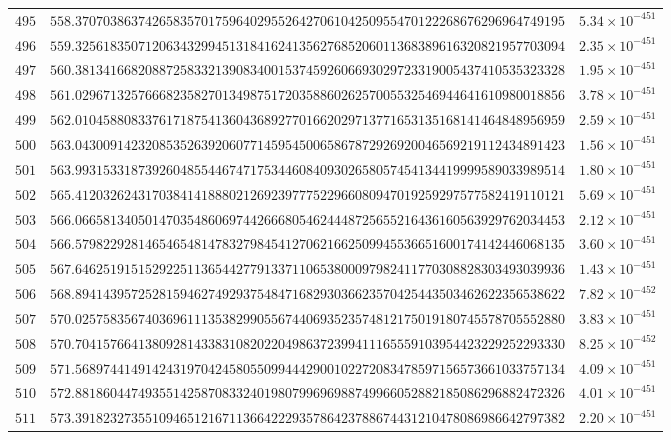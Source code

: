 \documentclass[12pt,reqno]{amsart}
\theoremstyle{remark}
\begin{document}
\begin{longtable}{clc}
$495$ & $558.3707038637426583570175964029552642706104250955470122268676296964749195$ & $5.34\times 10^{-451}$ \\
$496$ & $559.3256183507120634329945131841624135627685206011368389616320821957703094$ & $2.35\times 10^{-451}$ \\
$497$ & $560.3813416682088725833213908340015374592606693029723319005437410535323328$ & $1.95\times 10^{-451}$ \\
$498$ & $561.0296713257666823582701349875172035886026257005532546944641610980018856$ & $3.78\times 10^{-451}$ \\
$499$ & $562.0104588083376171875413604368927701662029713771653135168141464848956959$ & $2.59\times 10^{-451}$ \\
$500$ & $563.0430091423208535263920607714595450065867872926920046569219112434891423$ & $1.56\times 10^{-451}$ \\
$501$ & $563.9931533187392604855446747175344608409302658057454134419999589033989514$ & $1.80\times 10^{-451}$ \\
$502$ & $565.4120326243170384141888021269239777522966080947019259297577582419110121$ & $5.69\times 10^{-451}$ \\
$503$ & $566.0665813405014703548606974426668054624448725655216436160563929762034453$ & $2.12\times 10^{-451}$ \\
$504$ & $566.5798229281465465481478327984541270621662509945536651600174142446068135$ & $3.60\times 10^{-451}$ \\
$505$ & $567.6462519151529225113654427791337110653800097982411770308828303493039936$ & $1.43\times 10^{-451}$ \\
$506$ & $568.8941439572528159462749293754847168293036623570425443503462622356538622$ & $7.82\times 10^{-452}$ \\
$507$ & $570.0257583567403696111353829905567440693523574812175019180745578705552880$ & $3.83\times 10^{-451}$ \\
$508$ & $570.7041576641380928143383108202204986372399411165559103954423229252293330$ & $8.25\times 10^{-452}$ \\
$509$ & $571.5689744149142431970424580550994442900102272083478597156573661033757134$ & $4.09\times 10^{-451}$ \\
$510$ & $572.8818604474935514258708332401980799696988749966052882185086296882472326$ & $4.01\times 10^{-451}$ \\
$511$ & $573.3918232735510946512167113664222935786423788674431210478086986642797382$ & $2.20\times 10^{-451}$ \\

\end{longtable}
\end{document}
